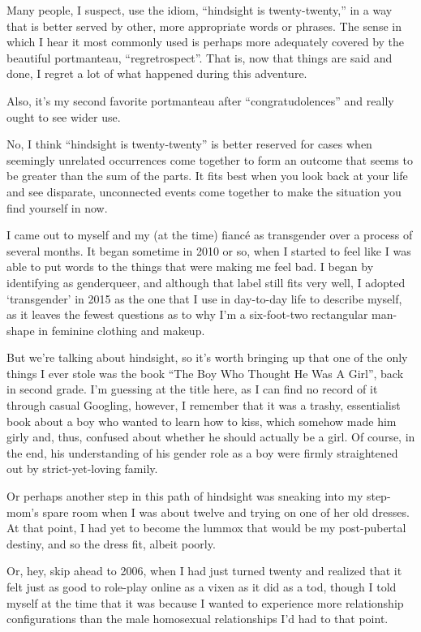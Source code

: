 Many people, I suspect, use the idiom, ``hindsight is twenty-twenty,'' in a way that is better served by other, more appropriate words or phrases.  The sense in which I hear it most commonly used is perhaps more adequately covered by the beautiful portmanteau, ``regretrospect''. That is, now that things are said and done, I regret a lot of what happened during this adventure.

Also, it's my second favorite portmanteau after ``congratudolences'' and really ought to see wider use.

No, I think ``hindsight is twenty-twenty'' is better reserved for cases when seemingly unrelated occurrences come together to form an outcome that seems to be greater than the sum of the parts. It fits best when you look back at your life and see disparate, unconnected events come together to make the situation you find yourself in now.

I came out to myself and my (at the time) fianc\'e as transgender over a process of several months. It began sometime in 2010 or so, when I started to feel like I was able to put words to the things that were making me feel bad. I began by identifying as genderqueer, and although that label still fits very well, I adopted `transgender' in 2015 as the one that I use in day-to-day life to describe myself, as it leaves the fewest questions as to why I'm a six-foot-two rectangular man-shape in feminine clothing and makeup.

But we're talking about hindsight, so it's worth bringing up that one of the only things I ever stole was the book ``The Boy Who Thought He Was A Girl'', back in second grade. I'm guessing at the title here, as I can find no record of it through casual Googling, however, I remember that it was a trashy, essentialist book about a boy who wanted to learn how to kiss, which somehow made him girly and, thus, confused about whether he should actually be a girl. Of course, in the end, his understanding of his gender role as a boy were firmly straightened out by strict-yet-loving family.

Or perhaps another step in this path of hindsight was sneaking into my step-mom's spare room when I was about twelve and trying on one of her old dresses. At that point, I had yet to become the lummox that would be my post-pubertal destiny, and so the dress fit, albeit poorly.

Or, hey, skip ahead to 2006, when I had just turned twenty and realized that it felt just as good to role-play online as a vixen as it did as a tod, though I told myself at the time that it was because I wanted to experience more relationship configurations than the male homosexual relationships I'd had to that point.

